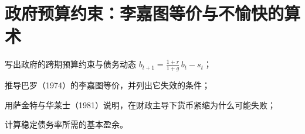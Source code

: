\chapter{政府预算约束：李嘉图等价与不愉快的算术}\label{ch:budget}

\begin{chapterguide}
\begin{guidegoals}
\item 写出政府的跨期预算约束与债务动态 $b_{t+1}=\frac{1+r}{1+g}\,b_t-s_t$；
\item 推导巴罗（1974）的李嘉图等价，并列出它失效的条件；
\item 用萨金特与华莱士（1981）说明，在财政主导下货币紧缩为什么可能失败；
\item 计算稳定债务率所需的基本盈余。
\end{guidegoals}
\end{chapterguide}

\chapterstub
